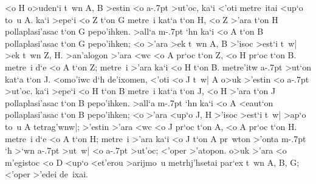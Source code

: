 \begin{Parallel}{}{}
{{<o H o>uden`i t~wn A, B >estin <o a\kern -.7pt >ut'oc, ka`i <'oti metre~itai <up`o
to~u A. ka`i >epe`i <o Z t`on G metre~i kat`a t`on H,  <o Z >'ara t`on H
pollaplasi'asac t`on G pepo'ihken. >all`a m\kern -.7pt `hn ka`i <o A t`on B pollaplasi'asac
t`on G pepo'ihken; <o >'ara >ek t~wn A, B >'isoc >est`i t~w| >ek t~wn Z, H.
>an'alogon >'ara <wc <o A pr`oc t`on Z, <o H pr`oc t`on  B.  metre~i d`e <o
A t`on Z; metre~i >'ara ka`i <o H t`on B. metre'itw
a\kern -.7pt >ut`on kat`a t`on J. <omo'iwc d`h
de'ixomen, <'oti <o J t~w| A o>uk >'estin
<o a\kern -.7pt >ut'oc. ka`i >epe`i <o H t`on B metre~i kat`a t`on J,  <o H >'ara t`on
J pollaplasi'asac t`on B pepo'ihken. >all`a m\kern -.7pt `hn ka`i <o A <eaut`on pollaplasi'asac t`on B pepo'ihken; <o >'ara <up`o J, H >'isoc >est`i t~w|
>ap`o to~u A tetrag'wnw|;  >'estin >'ara <wc <o J pr`oc t`on A, <o A
pr`oc t`on H. metre~i d`e <o A t`on H; metre~i >'ara ka`i <o J t`on A
pr~wton >'onta m\kern -.7pt `h >`wn a\kern -.7pt >ut~w| <o a\kern -.7pt >ut'oc; <'oper >'atopon.
o>uk >'ara <o m'egistoc <o D <up`o <et'erou >arijmo~u metrhj'hsetai
par`ex t~wn A, B, G; <'oper >'edei de~ixai.}}

\end{Parallel}

